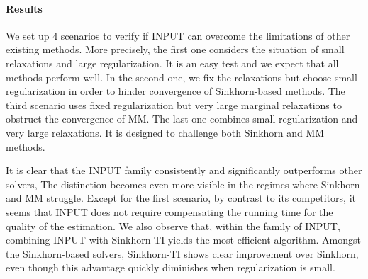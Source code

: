 \paragraph{Results}
We set up $4$ scenarios to verify if INPUT can overcome the limitations of other existing methods.
More precisely, the first one considers the situation of small relaxations and large regularization.
It is an easy test and we expect that all methods perform well.
In the second one, we fix the relaxations but choose small regularization
in order to hinder convergence of Sinkhorn-based methods.
The third scenario uses fixed regularization but very large marginal relaxations to obstruct
the convergence of MM.
The last one combines small regularization and very large relaxations. It is designed to challenge
both Sinkhorn and MM methods.

It is clear that the INPUT family consistently and significantly outperforms other solvers,
The distinction becomes even more visible in the regimes where Sinkhorn and MM struggle.
Except for the first scenario, by contrast to its competitors,
it seems that INPUT does not require compensating the running time for the quality of the estimation.
We also observe that, within the family of INPUT,
combining INPUT with Sinkhorn-TI yields the most efficient algorithm.
Amongst the Sinkhorn-based solvers, Sinkhorn-TI shows clear improvement over Sinkhorn,
even though this advantage quickly diminishes when regularization is small.

